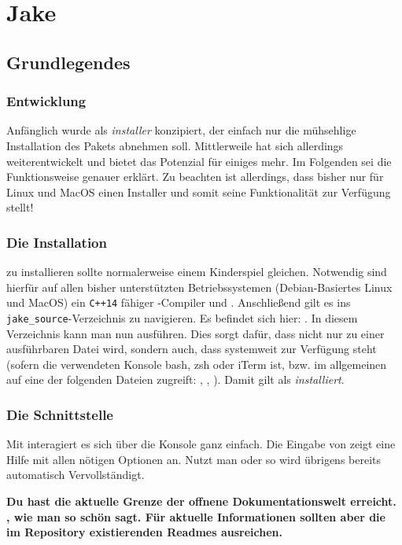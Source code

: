\renewcommand{\arraystretch}{1.5}
\chapter[Jake \LILLYxBOXxVersion{\small 1.0.8}]{Jake}
\section{Grundlegendes}
\subsection{Entwicklung}
Anfänglich wurde \Jake als \emph{installer} konzipiert, der einfach nur die mühsehlige Installation
des Pakets abnehmen soll. Mittlerweile hat sich \Jake allerdings weiterentwickelt und
bietet das Potenzial für einiges mehr. Im Folgenden sei die Funktionsweise genauer erklärt. 
Zu beachten ist allerdings, dass \Jake bisher nur für Linux und MacOS einen Installer und somit
seine Funktionalität zur Verfügung stellt!

\subsection{Die Installation}
\Jake zu installieren sollte normalerweise einem Kinderspiel gleichen. Notwendig sind hierfür
auf allen bisher unterstützten Betriebssystemen (Debian-Basiertes Linux und MacOS) ein
\verb|C++14| fähiger -Compiler und .
Anschließend gilt es ins \verb|jake_source|-Verzeichnis zu navigieren. 
Es befindet sich hier: . 
In diesem Verzeichnis kann man nun  ausführen. Dies sorgt dafür,
dass nicht nur  zu einer ausführbaren Datei wird, sondern auch,
dass \LJake systemweit zur Verfügung steht (sofern die verwendeten Konsole
bash, zsh oder iTerm ist, bzw. im allgemeinen auf eine der folgenden Dateien
zugreift: , , ).\newline
Damit gilt \Jake als \emph{installiert}.

\subsection{Die Schnittstelle}
Mit \Jake interagiert es sich über die Konsole ganz einfach. 
Die Eingabe von \LJake zeigt eine Hilfe mit allen nötigen Optionen an.
Nutzt man  oder  so wird \Jake übrigens bereits automatisch
Vervollständigt.\bigskip\newline

\textbf{Du hast die aktuelle Grenze der offnene Dokumentationswelt erreicht. , wie man so schön sagt. Für aktuelle Informationen sollten aber die im Repository existierenden Readmes ausreichen.}